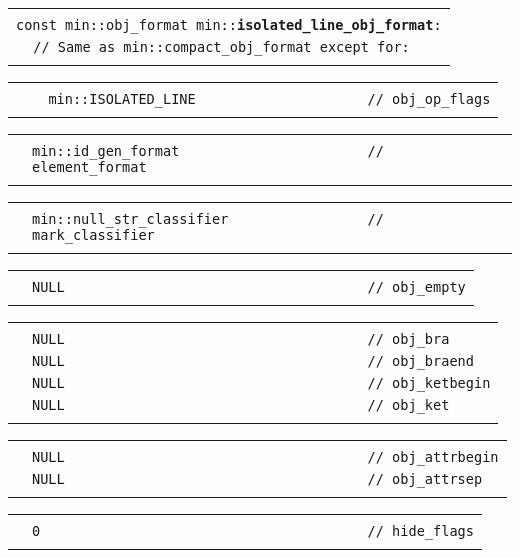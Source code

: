 \documentclass[12pt]{article}
\makeatletter
\newcommand{\TT}[1]{{\tt \bfseries #1}}
\newcommand{\ttindex}[1]{\index{#1@{\tt #1}}}
\newenvironment{indpar}[1][0.3in]%
	{\begin{list}{}%
		     {\setlength{\itemsep}{0in}%
		      \setlength{\topsep}{0in}%
		      \setlength{\parsep}{1ex}%
		      \setlength{\labelwidth}{#1}%
		      \setlength{\leftmargin}{#1}%
		      \addtolength{\leftmargin}{\labelsep}}%
	 \item}%
	{\end{list}}
\newcommand{\LABEL}[1]{\label{#1}}
\newlength{\ARGBREAKLENGTH}
\newcommand{\ARGBREAK}[1][\ARGBREAKLENGTH]{\\&\hspace*{#1}}
\newcommand{\MINKEY}[1]%
	   {\TT{#1}\ttindex{min::#1}\ttindex{#1}}
\makeatother
\begin{document}
\begin{indpar}[1em]

\begin{tabular}{r@{}l}\hspace*{0.1in} \\[-3ex]
\multicolumn{2}{l}{\tt const min::obj\_format
                   min::\MINKEY{isolated\_line\_obj\_format}:}%
\LABEL{MIN::ISOLATED_LINE_OBJ_FORMAT}\ARGBREAK
\verb|// Same as min::compact_obj_format except for:|\ARGBREAK
\end{tabular}

\vspace{-4ex}\begin{tabular}{r@{}l}\hspace*{0.1in}\ARGBREAK
\verb|  min::ISOLATED_LINE                     // obj_op_flags|\ARGBREAK
\end{tabular}

\vspace{-4ex}\begin{tabular}{r@{}l}\hspace*{0.1in}\ARGBREAK
\verb|min::id_gen_format                       // element_format|\ARGBREAK
\end{tabular}

\vspace{-4ex}\begin{tabular}{r@{}l}\hspace*{0.1in}\ARGBREAK
\verb|min::null_str_classifier                 // mark_classifier|\ARGBREAK
\end{tabular}

\vspace{-4ex}\begin{tabular}{r@{}l}\hspace*{0.1in}\ARGBREAK
\verb|NULL                                     // obj_empty|\ARGBREAK
\end{tabular}

\vspace{-4ex}\begin{tabular}{r@{}l}\hspace*{0.1in}\ARGBREAK
\verb|NULL                                     // obj_bra|\ARGBREAK
\verb|NULL                                     // obj_braend|\ARGBREAK
\verb|NULL                                     // obj_ketbegin|\ARGBREAK
\verb|NULL                                     // obj_ket|\ARGBREAK
\end{tabular}

\vspace{-4ex}\begin{tabular}{r@{}l}\hspace*{0.1in}\ARGBREAK
\verb|NULL                                     // obj_attrbegin|\ARGBREAK
\verb|NULL                                     // obj_attrsep|\ARGBREAK
\end{tabular}

\vspace{-4ex}\begin{tabular}{r@{}l}\hspace*{0.1in}\ARGBREAK
\verb|0                                        // hide_flags|\ARGBREAK
\end{tabular}


\end{indpar}
\end{document}
